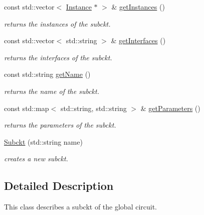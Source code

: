 \begin{DoxyCompactItemize}
const std\+::vector$<$ \hyperlink{class_s_p_i_c_e_1_1_instance}{Instance} $\ast$ $>$ \& \hyperlink{class_s_p_i_c_e_1_1_subckt_a8e6e58ffab876152a740092520c35d73}{get\+Instances} ()
\begin{DoxyCompactList}\small\item\em returns the instances of the subckt. \end{DoxyCompactList}\item 
\mbox{\label{class_s_p_i_c_e_1_1_subckt_a5df00fe6eb5e287abef28c76ce88bd1e}} 
const std\+::vector$<$ std\+::string $>$ \& \hyperlink{class_s_p_i_c_e_1_1_subckt_a5df00fe6eb5e287abef28c76ce88bd1e}{get\+Interfaces} ()
\begin{DoxyCompactList}\small\item\em returns the interfaces of the subckt. \end{DoxyCompactList}\item 
\mbox{\label{class_s_p_i_c_e_1_1_subckt_af55b1fe10eacd22c7ff3544b5ed32ef3}} 
const std\+::string \hyperlink{class_s_p_i_c_e_1_1_subckt_af55b1fe10eacd22c7ff3544b5ed32ef3}{get\+Name} ()
\begin{DoxyCompactList}\small\item\em returns the name of the subckt. \end{DoxyCompactList}\item 
\mbox{\label{class_s_p_i_c_e_1_1_subckt_aee7d59083b78d31ac5c19ab508da91e0}} 
const std\+::map$<$ std\+::string, std\+::string $>$ \& \hyperlink{class_s_p_i_c_e_1_1_subckt_aee7d59083b78d31ac5c19ab508da91e0}{get\+Parameters} ()
\begin{DoxyCompactList}\small\item\em returns the parameters of the subckt. \end{DoxyCompactList}\item 
\hyperlink{class_s_p_i_c_e_1_1_subckt_a5b9ee31a0302af435029f29a93b29d7d}{Subckt} (std\+::string name)
\begin{DoxyCompactList}\small\item\em creates a new subckt. \end{DoxyCompactList}\end{DoxyCompactItemize}


\subsection{Detailed Description}
This class describes a subckt of the global circuit. 

